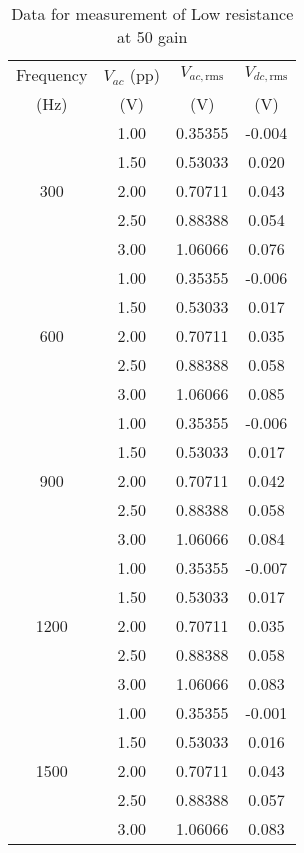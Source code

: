 \begin{table}[H]
    \centering
    \begin{tabular}{|c|c|c|c|}
    \hline
    Frequency& $V_{ac}$ (pp)& $V_{ac, \text{rms}}$ & $V_{dc, \text{rms}}$ \\
    (Hz) & (V) & (V)&  (V) \\ \hline
    \multirow{5}{*}{300} & 1.00 & 0.35355 & -0.004 \\ \cline{2-4} 
 & 1.50 & 0.53033 & 0.020 \\ \cline{2-4} 
 & 2.00 & 0.70711 & 0.043 \\ \cline{2-4} 
 & 2.50 & 0.88388 & 0.054 \\ \cline{2-4} 
 & 3.00 & 1.06066 & 0.076 \\ \hline
\multirow{5}{*}{600} & 1.00 & 0.35355 & -0.006 \\ \cline{2-4} 
 & 1.50 & 0.53033 & 0.017 \\ \cline{2-4} 
 & 2.00 & 0.70711 & 0.035 \\ \cline{2-4} 
 & 2.50 & 0.88388 & 0.058 \\ \cline{2-4} 
 & 3.00 & 1.06066 & 0.085 \\ \hline
\multirow{5}{*}{900} & 1.00 & 0.35355 & -0.006 \\ \cline{2-4} 
 & 1.50 & 0.53033 & 0.017 \\ \cline{2-4} 
 & 2.00 & 0.70711 & 0.042 \\ \cline{2-4} 
 & 2.50 & 0.88388 & 0.058 \\ \cline{2-4} 
 & 3.00 & 1.06066 & 0.084 \\ \hline
\multirow{5}{*}{1200} & 1.00 & 0.35355 & -0.007 \\ \cline{2-4} 
 & 1.50 & 0.53033 & 0.017 \\ \cline{2-4} 
 & 2.00 & 0.70711 & 0.035 \\ \cline{2-4} 
 & 2.50 & 0.88388 & 0.058 \\ \cline{2-4} 
 & 3.00 & 1.06066 & 0.083 \\ \hline
\multirow{5}{*}{1500} & 1.00 & 0.35355 & -0.001 \\ \cline{2-4} 
 & 1.50 & 0.53033 & 0.016 \\ \cline{2-4} 
 & 2.00 & 0.70711 & 0.043 \\ \cline{2-4} 
 & 2.50 & 0.88388 & 0.057 \\ \cline{2-4} 
 & 3.00 & 1.06066 & 0.083 \\ \hline
    \end{tabular}%
    \caption{Data for measurement of Low resistance at
    50 gain}
    \label{res50}
    \end{table}